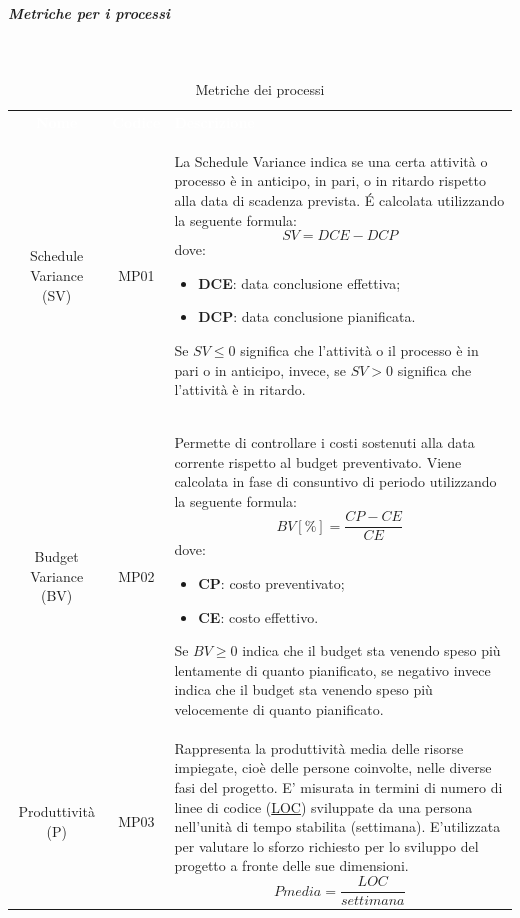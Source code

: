 \subparagraph{Metriche per i processi}  \mbox{} \\ 
\begin{table}[H]
\caption{Metriche dei processi}
	\begin{center}
	\begin{tabular}{ c | c | L{9.5cm} }
		\textcolor{white}{\textbf{Nome}} & \textcolor{white}{\textbf{Codice}}& \centerline{\textcolor{white}{\textbf{Descrizione}}} \\
		Schedule Variance (SV)  & MP01 & La Schedule Variance indica se una certa attività o processo è in anticipo, in pari, o in ritardo rispetto alla data di scadenza prevista. \'E calcolata utilizzando la seguente formula: \newline
\[ SV = DCE-DCP\]
dove: \begin{itemize}
\item \textbf{DCE}: data conclusione effettiva;
\item \textbf{DCP}: data conclusione pianificata.
\end{itemize}
Se $SV \leq 0$ significa che l’attività o il processo è in pari o in anticipo, invece, se $SV > 0$ significa che l’attività è in ritardo. \\	
		Budget Variance (BV) & MP02 & Permette di controllare i costi sostenuti alla data corrente rispetto al budget preventivato. Viene calcolata in fase di consuntivo di periodo utilizzando la seguente formula: \newline
		\[ BV[\%] = \frac{CP-CE}{CE} \]		
dove: \begin{itemize}
\item \textbf{CP}: costo preventivato;
\item \textbf{CE}: costo effettivo.
\end{itemize}
Se $BV \geq 0$ indica che il budget sta venendo speso più lentamente di quanto pianificato, se negativo invece indica che il budget sta venendo speso più velocemente di quanto pianificato. \\
Produttività (P) & MP03 & Rappresenta la produttività media delle risorse impiegate, cioè delle persone coinvolte, nelle diverse fasi del progetto. E’ misurata in termini di numero di linee di codice (\hyperref[par:MS01]{LOC}) sviluppate da una persona nell’unità di tempo stabilita (settimana). E’utilizzata per valutare lo sforzo richiesto per lo sviluppo  del progetto a fronte delle sue dimensioni. 
\[ Pmedia = \frac{LOC}{settimana}\]
	\end{tabular}
	\end{center}
	\end{table}
